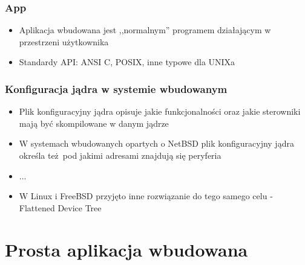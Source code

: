 \documentclass[dvipsnames,table]{beamer}
\begin{document}
\begin{frame}
\frametitle{App}
\begin{itemize}
	\item Aplikacja wbudowana jest ,,normalnym'' programem działającym w przestrzeni użytkownika
	\item Standardy API: ANSI C, POSIX, inne typowe dla UNIXa
\end{itemize}
\end{frame}

\begin{frame}
\frametitle{Konfiguracja jądra w systemie wbudowanym}
\begin{itemize}
	\item Plik konfiguracyjny jądra opisuje jakie funkcjonalności oraz jakie sterowniki mają być skompilowane w danym jądrze
	\item W systemach wbudowanych opartych o NetBSD plik konfiguracyjny jądra określa też pod jakimi adresami znajdują się peryferia
	\item ...
	\item W Linux i FreeBSD przyjęto inne rozwiązanie do tego samego celu - Flattened Device Tree
\end{itemize}
\end{frame}


\section{Prosta aplikacja wbudowana}
\end{document}
